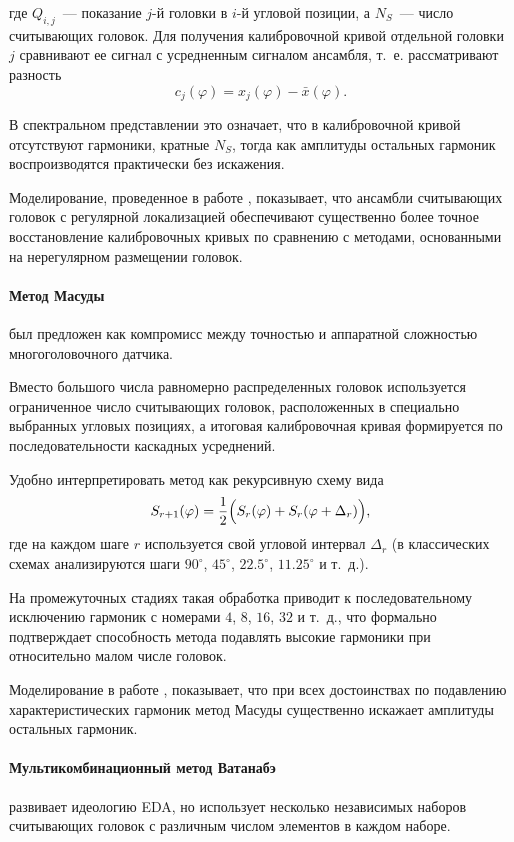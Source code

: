 где $Q_{i,j}$~--- показание $j$-й головки в $i$-й угловой позиции, а $N_S$~--- число считывающих головок.
Для получения калибровочной кривой отдельной головки $j$ сравнивают ее сигнал с усредненным сигналом ансамбля, т.~е. рассматривают разность
$$
c_j(\varphi)
=
x_j(\varphi) - \bar{x}(\varphi).
$$

В спектральном представлении это означает, что в калибровочной кривой отсутствуют гармоники, кратные $N_S$, тогда как амплитуды остальных гармоник воспроизводятся практически без искажения.

Моделирование, проведенное в работе \cite{kiryanov-overview}, показывает, что ансамбли считывающих головок с регулярной локализацией обеспечивают существенно более точное восстановление калибровочных кривых по сравнению с методами, основанными на нерегулярном размещении головок.

\paragraph{Метод Масуды} \cite{masuda} был предложен как компромисс между точностью и аппаратной сложностью многоголовочного датчика.

Вместо большого числа равномерно распределенных головок используется ограниченное число считывающих головок, расположенных в специально выбранных угловых позициях, а итоговая калибровочная кривая формируется по последовательности каскадных усреднений.

Удобно интерпретировать метод как рекурсивную схему вида
$$
S_{r+1}(\varphi)
=
\frac{1}{2}
\Bigl(
S_r(\varphi) + S_r(\varphi + \Delta_r)
\Bigr),
$$
где на каждом шаге $r$ используется свой угловой интервал $\Delta_r$ (в классических схемах анализируются шаги $90^\circ$, $45^\circ$, $22.5^\circ$, $11.25^\circ$ и т.~д.).

На промежуточных стадиях такая обработка приводит к последовательному исключению гармоник с номерами $4$, $8$, $16$, $32$ и т.~д., что формально подтверждает способность метода подавлять высокие гармоники при относительно малом числе головок.

Моделирование в работе \cite{kiryanov-overview}, показывает, что при всех достоинствах по подавлению характеристических гармоник метод Масуды существенно искажает амплитуды остальных гармоник.

\paragraph{Мультикомбинационный метод Ватанабэ} \cite{watanabe-selfa}
развивает идеологию EDA, но использует несколько независимых наборов считывающих головок с различным числом элементов в каждом наборе.

